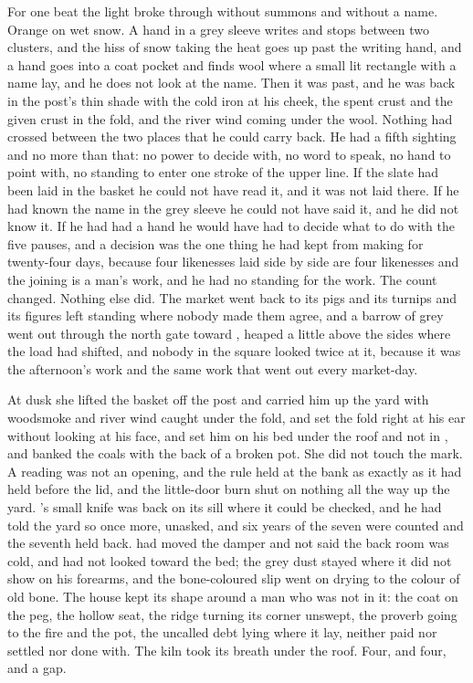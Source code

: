 For one beat the light broke through without summons and without a name. Orange on wet snow. A hand in a grey sleeve writes and stops between two clusters, and the hiss of snow taking the heat goes up past the writing hand, and a hand goes into a coat pocket and finds wool where a small lit rectangle with a name lay, and he does not look at the name. Then it was past, and he was back in the post's thin shade with the cold iron at his cheek, the spent crust and the given crust in the fold, and the river wind coming under the wool. Nothing had crossed between the two places that he could carry back. He had a fifth sighting and no more than that: no power to decide with, no word to speak, no hand to point with, no standing to enter one stroke of the upper line. If the slate had been laid in the basket he could not have read it, and it was not laid there. If he had known the name in the grey sleeve he could not have said it, and he did not know it. If he had had a hand he would have had to decide what to do with the five pauses, and a decision was the one thing he had kept from making for twenty-four days, because four likenesses laid side by side are four likenesses and the joining is a man's work, and he had no standing for the work. The count changed. Nothing else did. The market went back to its pigs and its turnips and its figures left standing where nobody made them agree, and a barrow of grey went out through the north gate toward , heaped a little above the sides where the load had shifted, and nobody in the square looked twice at it, because it was the afternoon's work and the same work that went out every market-day.

At dusk she lifted the basket off the post and carried him up the yard with woodsmoke and river wind caught under the fold, and set the fold right at his ear without looking at his face, and set him on his bed under the roof and not in , and banked the coals with the back of a broken pot. She did not touch the mark. A reading was not an opening, and the rule held at the bank as exactly as it had held before the lid, and the little-door burn shut on nothing all the way up the yard. 's small knife was back on its sill where it could be checked, and he had told the yard so once more, unasked, and six years of the seven were counted and the seventh held back.  had moved the damper and not said the back room was cold, and had not looked toward the bed; the grey dust stayed where it did not show on his forearms, and the bone-coloured slip went on drying to the colour of old bone. The house kept its shape around a man who was not in it: the coat on the peg, the hollow seat, the ridge turning its corner unswept, the proverb going to the fire and the pot, the uncalled debt lying where it lay, neither paid nor settled nor done with. The kiln took its breath under the roof. Four, and four, and a gap.

